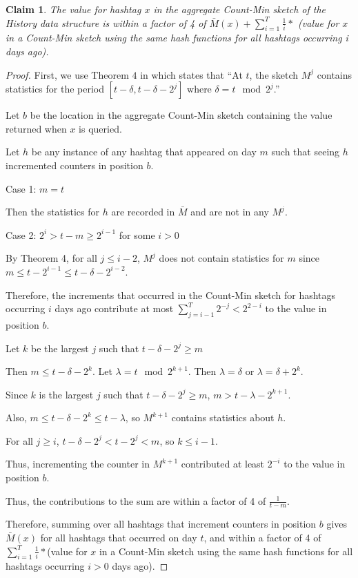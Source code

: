 \documentclass[twoside]{article}
\newtheorem{claim}{Claim}
\newcommand{\cc}[1]
 {\textbf{\cite{#1}}}
\begin{document}
\begin{claim}
The value for hashtag $x$ in the aggregate Count-Min sketch of the History data structure is within a factor of 4 of $\bar{M}(x) + \sum\limits_{i=1}^T \frac{1}{i}*$ (value for $x$ in a Count-Min sketch using the same hash functions for all hashtags occurring i days ago).
\end{claim}
\begin{proof}
First, we use Theorem $4$ in \cc{Matusevych:2012} which states that ``At $t$, the sketch $M^j$ contains statistics for the period $[t - \delta, t - \delta - 2^j]$ where $\delta = t \mod 2^j$.''

Let $b$ be the location in the aggregate Count-Min sketch containing the value returned when $x$ is queried.

Let $h$ be any instance of any hashtag that appeared on day $m$ such that seeing $h$ incremented counters in position $b$.

Case 1: $m=t$

Then the statistics for $h$ are recorded in $\bar{M}$ and are not in any $M^j$.

Case 2: $2^i > t-m \geq 2^{i-1}$ for some $i > 0$

By Theorem 4, for all $j \leq i - 2$, $M^j$ does not contain statistics for $m$ since $m \leq t - 2^{i-1} \leq t - \delta - 2^{i-2}$.

Therefore, the increments that occurred in the Count-Min sketch for hashtags occurring $i$ days ago contribute at most $\sum\limits_{j = i - 1}^{T} 2^{-j} < 2^{2-i}$ to the value in position $b$.

Let $k$ be the largest $j$ such that $t - \delta - 2^j \geq m$

Then $m \leq t - \delta - 2^k$.  Let $\lambda = t \mod 2^{k+1}$.  Then $\lambda = \delta$ or $\lambda = \delta + 2^k$.

Since $k$ is the largest $j$ such that $t - \delta - 2^j \geq m$, $m > t - \lambda - 2^{k+1}$.

Also, $m \leq t - \delta - 2^k \leq t - \lambda$, so $M^{k+1}$ contains statistics about $h$.

For all $j \geq i$, $t - \delta - 2^j < t - 2^j < m$, so $k \leq i - 1$. 

Thus, incrementing the counter in $M^{k + 1}$ contributed at least $2^{-i}$ to the value in position $b$.

Thus, the contributions to the sum are within a factor of 4 of $\frac{1}{t-m}$.

Therefore, summing over all hashtags that increment counters in position $b$ gives $\bar{M}(x)$ for all hashtags that occurred on day $t$, and within a factor of 4 of $\sum\limits_{i=1}^T \frac{1}{i}*$(value for $x$ in a Count-Min sketch using the same hash functions for all hashtags occurring $i > 0$ days ago). 
\end{proof}
\end{document}
